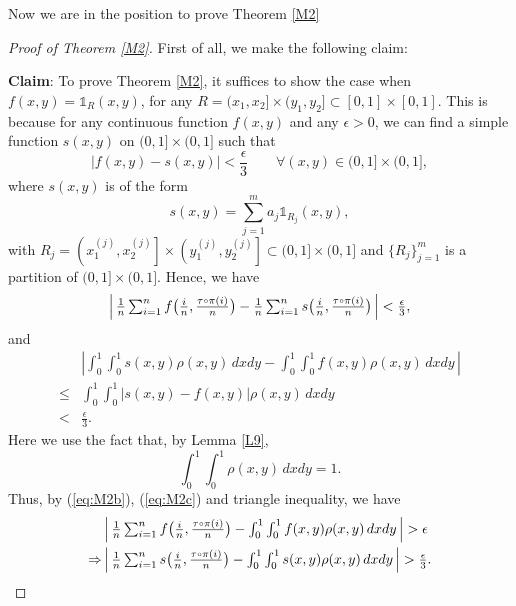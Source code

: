 


Now we are in the position to prove Theorem \ref{M2}



\begin{proof}[Proof of Theorem \ref{M2}]
First of all, we make the following claim:

\textbf{Claim}: To prove Theorem \ref{M2}, it suffices to show the case when $f(x, y) = \mathds{1}_R(x, y)$, for any
$R = (x_1, x_2] \times (y_1, y_2] \subset [0, 1]\times[0, 1]$. 
This is because for any continuous function $f(x, y)$ and any $\epsilon > 0$, we can find a simple function $s(x, y)$ on $(0, 1]\times(0, 1]$ such that
\[
|f(x, y) - s(x, y)| < \frac{\epsilon}{3} \qquad \forall (x, y) \in (0, 1]\times(0, 1],
\]
where $s(x, y)$ is of the form
\[
s(x, y) = \sum_{j = 1}^{m}a_j\mathds{1}_{R_j}(x, y),
\]
with $R_j = \left(x_1^{(j)}, x_2^{(j)}\right]\times\left(y_1^{(j)}, y_2^{(j)}\right] \subset (0, 1]\times(0, 1]$ and $\{R_j\}_{j = 1}^{m}$ is a partition of $(0, 1]\times(0, 1]$.
Hence, we have
\begin{equation}\label{eq:M2b}
\textstyle\left|\, \frac{1}{n}\sum_{i=1}^{n}f\big(\frac{i}{n}, \frac{\tau \ccirc \pi(i)}{n}\big) -
\frac{1}{n}\sum_{i=1}^{n}s\big(\frac{i}{n}, \frac{\tau \ccirc \pi(i)}{n}\big) \,\right| < \frac{\epsilon}{3},
\end{equation}
and
\begin{align}
&\textstyle\left|\int_0^1\int_0^1 s(x, y) \rho(x, y)\,dxdy - \int_0^1\int_0^1 f(x, y) \rho(x, y)\,dxdy\, \right| \label{eq:M2c}\\
\le &\textstyle \int_0^1\int_0^1 \left|s(x, y) - f(x, y)\right| \rho(x, y)\,dxdy \nonumber\\
< &\textstyle\frac{\epsilon}{3}. \nonumber
\end{align}
Here we use the fact that, by Lemma \ref{L9},
\[
\textstyle\int_0^1\int_0^1 \rho(x, y) \, dxdy = 1.
\]
Thus, by (\ref{eq:M2b}), (\ref{eq:M2c}) and triangle inequality, we have
\begin{align*}
   &\textstyle\left|\, \frac{1}{n}\sum_{i=1}^{n}f\big(\frac{i}{n}, \frac{\tau \ccirc \pi(i)}{n}\big) -
  \int_0^1\int_0^1 f(x, y) \rho(x, y)\,dxdy\, \right| > \epsilon\\
 \Rightarrow&\textstyle \left|\, \frac{1}{n}\sum_{i=1}^{n}s\big(\frac{i}{n}, \frac{\tau \ccirc \pi(i)}{n}\big) -
    \int_0^1\int_0^1 s(x, y) \rho(x, y)\,dxdy \,\right| > \frac{\epsilon}{3}.

\end{align*}
\end{proof}
